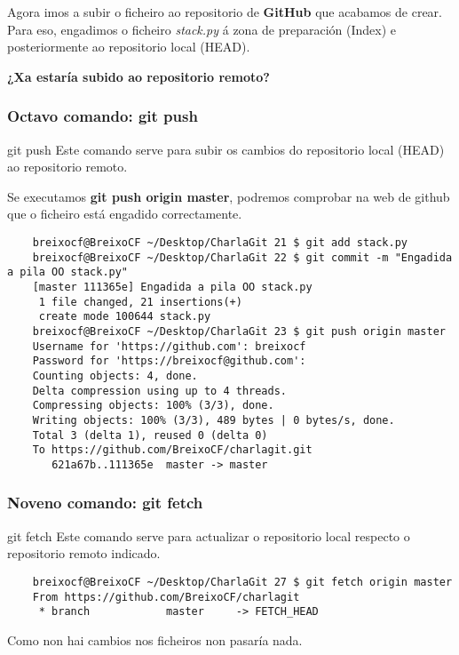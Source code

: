 \begin{frame}
  \normalsize
  Agora imos a subir o ficheiro ao repositorio de \textbf{GitHub} que acabamos de crear. Para eso, engadimos o ficheiro \textit{stack.py} á zona de preparación (Index) e posteriormente ao repositorio local (HEAD).\\
  \vspace{2cm}
  \large
  \begin{center}
    \textbf{¿Xa estaría subido ao repositorio remoto?}
  \end{center}
\end{frame}

\begin{frame}[fragile]
  \frametitle{Octavo comando: git push}
  \begin{block}{git push}
    Este comando serve para subir os cambios do repositorio local (HEAD) ao repositorio remoto.
  \end{block}
  \scriptsize
  Se executamos \textbf{git push origin master}, podremos comprobar na web de github que o ficheiro está engadido correctamente.
  \tiny 
\begin{verbatim}
	breixocf@BreixoCF ~/Desktop/CharlaGit 21 $ git add stack.py 
	breixocf@BreixoCF ~/Desktop/CharlaGit 22 $ git commit -m "Engadida a pila OO stack.py"
	[master 111365e] Engadida a pila OO stack.py
	 1 file changed, 21 insertions(+)
	 create mode 100644 stack.py
	breixocf@BreixoCF ~/Desktop/CharlaGit 23 $ git push origin master 
	Username for 'https://github.com': breixocf
	Password for 'https://breixocf@github.com': 
	Counting objects: 4, done.
	Delta compression using up to 4 threads.
	Compressing objects: 100% (3/3), done.
	Writing objects: 100% (3/3), 489 bytes | 0 bytes/s, done.
	Total 3 (delta 1), reused 0 (delta 0)
	To https://github.com/BreixoCF/charlagit.git
	   621a67b..111365e  master -> master
\end{verbatim}
\end{frame}

\begin{frame}[fragile]
  \frametitle{Noveno comando: git fetch}
  \begin{block}{git fetch}
    Este comando serve para actualizar o repositorio local respecto o repositorio remoto indicado.
  \end{block}
  \scriptsize
\begin{verbatim}
	breixocf@BreixoCF ~/Desktop/CharlaGit 27 $ git fetch origin master
	From https://github.com/BreixoCF/charlagit
	 * branch            master     -> FETCH_HEAD
\end{verbatim}
  Como non hai cambios nos ficheiros non pasaría nada.
\end{frame}


